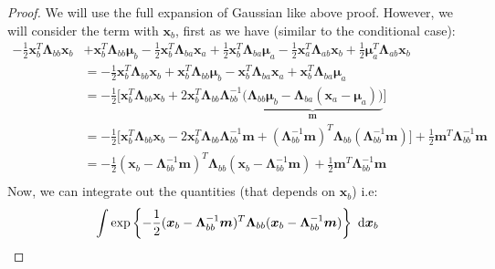 \begin{proof}
    We will use the full expansion of Gaussian like above proof. However, we will consider the term with $\boldsymbol x_b$, first as we have (similar to the conditional case):
    \begin{equation*}
    \begin{aligned}
        -\frac{1}{2}\boldsymbol x_b^T\boldsymbol \Lambda_{bb}\boldsymbol x_b &+ \boldsymbol x_b^T\boldsymbol \Lambda_{bb}\boldsymbol \mu_b - \frac{1}{2}\boldsymbol x_b^T\boldsymbol \Lambda_{ba}\boldsymbol x_a + \frac{1}{2}\boldsymbol x^T_b\boldsymbol \Lambda_{ba}\boldsymbol \mu_a - \frac{1}{2}\boldsymbol x_a^T\boldsymbol \Lambda_{ab}\boldsymbol x_b + \frac{1}{2}\boldsymbol \mu_a^T\boldsymbol \Lambda_{ab}\boldsymbol x_b \\ 
        &= -\frac{1}{2}\boldsymbol x_b^T\boldsymbol \Lambda_{bb}\boldsymbol x_b + \boldsymbol x_b^T\boldsymbol \Lambda_{bb}\boldsymbol \mu_b -\boldsymbol x_b^T\boldsymbol \Lambda_{ba}\boldsymbol x_a + \boldsymbol x^T_b\boldsymbol \Lambda_{ba}\boldsymbol \mu_a \\
        &= -\frac{1}{2} \Big[ \boldsymbol x_b^T\boldsymbol \Lambda_{bb} \boldsymbol x_b + 2\boldsymbol x_b^T\boldsymbol \Lambda_{bb}\boldsymbol \Lambda_{bb}^{-1}\underbrace{\big( \boldsymbol \Lambda_{bb}\boldsymbol \mu_b - \boldsymbol \Lambda_{ba}(\boldsymbol x_a - \boldsymbol \mu_a) \big)}_{\boldsymbol m} \Big] \\
        &= -\frac{1}{2} \Big[ \boldsymbol x_b^T\boldsymbol \Lambda_{bb} \boldsymbol x_b - 2\boldsymbol x_b^T\boldsymbol \Lambda_{bb}\boldsymbol \Lambda_{bb}^{-1}\boldsymbol m + (\boldsymbol \Lambda_{bb}^{-1}\boldsymbol m)^T\boldsymbol \Lambda_{bb}(\boldsymbol \Lambda_{bb}^{-1}\boldsymbol m)  \Big] + \frac{1}{2}\boldsymbol m^T\boldsymbol \Lambda_{bb}^{-1}\boldsymbol m \\
        &= -\frac{1}{2} (\boldsymbol x_b - \boldsymbol \Lambda_{bb}^{-1}\boldsymbol m)^T\boldsymbol \Lambda_{bb}(\boldsymbol x_b - \boldsymbol \Lambda_{bb}^{-1}\boldsymbol m) + \frac{1}{2}\boldsymbol m^T\boldsymbol \Lambda_{bb}^{-1}\boldsymbol m \\
    \end{aligned} 
    \end{equation*}
    Now, we can integrate out the quantities (that depends on $\boldsymbol x_b$) i.e:
    \begin{equation*}
        \int\exp\brackc{-\frac{1}{2} (\boldsymbol x_b - \boldsymbol \Lambda_{bb}^{-1}\boldsymbol m)^T\boldsymbol \Lambda_{bb}(\boldsymbol x_b - \boldsymbol \Lambda_{bb}^{-1}\boldsymbol m)}\dby \boldsymbol x_b

\end{equation*}
\end{proof}

